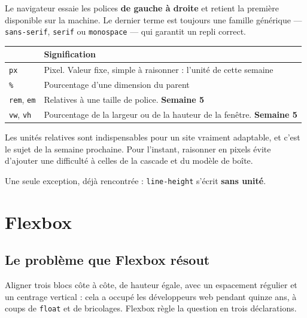 \documentclass[a4paper,11pt]{article}
\newcommand{\hdr}[1]{\multicolumn{1}{l}{\color{white}\bfseries #1}}
\renewcommand{\arraystretch}{1.3}
\begin{document}
Le navigateur essaie les polices \textbf{de gauche à droite} et retient la première disponible sur la machine. Le dernier terme est toujours une famille générique --- \texttt{sans-serif}, \texttt{serif} ou \texttt{monospace} --- qui garantit un repli correct.

\begin{center}
\renewcommand{\arraystretch}{1.0}
\begin{tabularx}{\linewidth}{p{2.2cm}X}
  \toprule
  \rowcolor{uniNavy}
  \hdr{Unité} & \hdr{Signification} \\
  \midrule
  \rowcolor{uniPaper}
  \texttt{px} & Pixel. Valeur fixe, simple à raisonner : l'unité de cette semaine \\
  \texttt{\%} & Pourcentage d'une dimension du parent \\
  \rowcolor{uniPaper}
  \texttt{rem}, \texttt{em} & Relatives à une taille de police. \textbf{Semaine 5} \\
  \texttt{vw}, \texttt{vh} & Pourcentage de la largeur ou de la hauteur de la fenêtre. \textbf{Semaine 5} \\
  \bottomrule
\end{tabularx}
\end{center}

\begin{tcolorbox}[astuce, title={Cette semaine, tout en pixels}]
Les unités relatives sont indispensables pour un site vraiment adaptable, et c'est le sujet de la semaine prochaine. Pour l'instant, raisonner en pixels évite d'ajouter une difficulté à celles de la cascade et du modèle de boîte.

\vspace{3pt}
Une seule exception, déjà rencontrée : \texttt{line-height} s'écrit \textbf{sans unité}.
\end{tcolorbox}

\section{Flexbox}

\subsection{Le problème que Flexbox résout}

Aligner trois blocs côte à côte, de hauteur égale, avec un espacement régulier et un centrage vertical : cela a occupé les développeurs web pendant quinze ans, à coups de \texttt{float} et de bricolages. Flexbox règle la question en trois déclarations.
\end{document}
